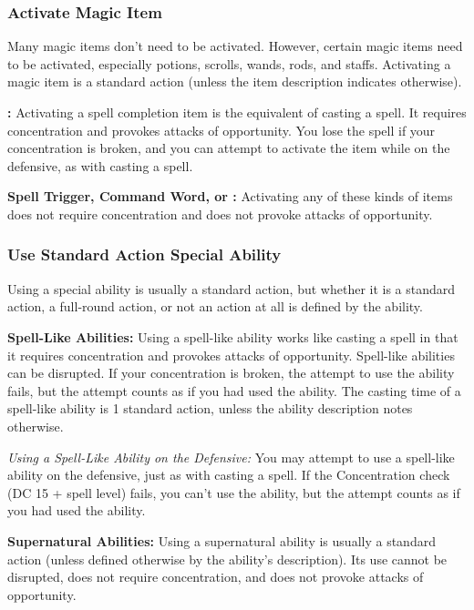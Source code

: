 \subsubsection{Activate Magic Item}

Many magic items don't need to be activated. However, certain magic items need 
to be activated, especially potions, scrolls, wands, rods, and staffs. Activating 
a magic item is a standard action (unless the item description indicates otherwise).

\textbf{:} Activating a spell completion item is the equivalent 
of casting a spell. It requires concentration and provokes attacks of opportunity. 
You lose the spell if your concentration is broken, and you can attempt to activate 
the item while on the defensive, as with casting a spell.

\textbf{Spell Trigger, Command Word,
or :} Activating any of 
these kinds of items does not require concentration and does not provoke attacks 
of opportunity.

\subsubsection{Use Standard Action Special Ability}

Using a special ability is usually a standard action, but whether it is a standard 
action, a full-round action, or not an action at all is defined by the ability.

\textbf{Spell-Like Abilities:} Using a spell-like ability works like casting a 
spell in that it requires concentration and provokes attacks of opportunity. Spell-like 
abilities can be disrupted. If your concentration is broken, the attempt to use 
the ability fails, but the attempt counts as if you had used the ability. The casting 
time of a spell-like ability is 1 standard action, unless the ability description 
notes otherwise.

\textit{Using a Spell-Like Ability on the Defensive:} You may attempt to use a 
spell-like ability on the defensive, just as with casting a spell. If the Concentration 
check (DC 15 + spell level) fails, you can't use the ability, but the attempt counts 
as if you had used the ability.

\textbf{Supernatural Abilities:} Using a supernatural ability is usually a standard 
action (unless defined otherwise by the ability's description). Its use cannot 
be disrupted, does not require concentration, and does not provoke attacks of opportunity.

